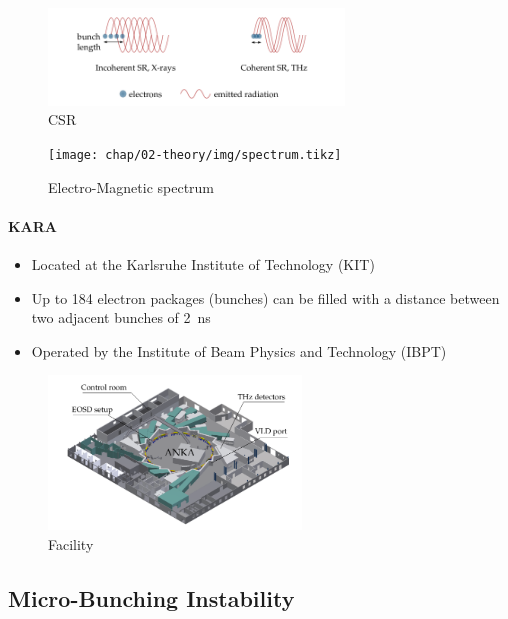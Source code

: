 \begin{figure}[H]
	\centering
	\includegraphics[width = 0.7\textwidth]{chap/02-theory/img/csr2.png}
	\caption{CSR \cite{rota2018}}
	\label{fig:csr}
\end{figure}



\begin{figure}[H]
	\centering
	\texttt{[image: chap/02-theory/img/spectrum.tikz]}
	\caption{Electro-Magnetic spectrum}
	\label{fig:spectrum}
\end{figure}





\paragraph{KARA}
\begin{itemize}
	\item Located at the Karlsruhe Institute of Technology (KIT)
	\item Up to 184 electron packages (bunches) can be filled with a distance between two adjacent bunches of \SI{2}{\nano \second}
	\item Operated by the Institute of Beam Physics and Technology (IBPT)
\end{itemize}

\begin{figure}[H]
	\centering
	\includegraphics[width = 0.6\textwidth]{chap/02-theory/img/kara.png}
	\caption{Facility \cite{rota2018}}
	\label{fig:kara}
\end{figure}

\subsection{Micro-Bunching Instability}


